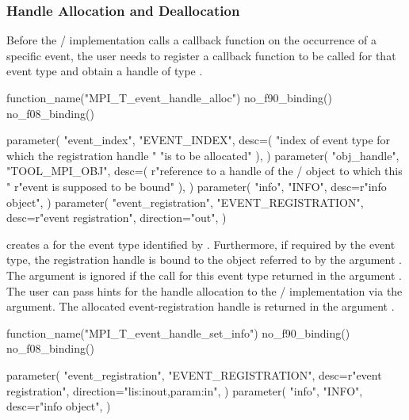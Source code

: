 \subsubsection{Handle Allocation and Deallocation}
\label{sec:tools:mpit:eventalloc}

Before the \MPI/ implementation calls a callback function on the occurrence of
a specific event, the user needs to register a callback function to be called for
that event type and obtain a handle of type
.

\begin{mpi-binding}
    function_name("MPI_T_event_handle_alloc")
    no_f90_binding()
    no_f08_binding()

    parameter(
        "event_index",
        "EVENT_INDEX",
        desc=(
            "index of event type for which the registration handle "
            "is to be allocated"
        ),
    )
    parameter(
        "obj_handle",
        "TOOL_MPI_OBJ",
        desc=(
            r"reference to a handle of the \mpi/ object to which this "
            r"event is supposed to be bound"
        ),
    )
    parameter(
        "info",
        "INFO",
        desc=r"info object",
    )
    parameter(
        "event_registration",
        "EVENT_REGISTRATION",
        desc=r"event registration",
        direction="out",
    )
\end{mpi-binding}

 creates a 
for the event type identified by . Furthermore,
if required by the event type, the registration handle is bound to the
object referred to by the argument .  The argument
 is ignored if the 
call for this event type returned  in the
argument .  The user can pass hints for the handle
allocation to the \MPI/ implementation via the  argument.  The
allocated event-registration handle is returned in the argument
.

\begin{mpi-binding}
    function_name("MPI_T_event_handle_set_info")
    no_f90_binding()
    no_f08_binding()

    parameter(
        "event_registration",
        "EVENT_REGISTRATION",
        desc=r"event registration",
        direction="lis:inout,param:in",
    )
    parameter(
        "info",
        "INFO",
        desc=r"info object",
    )
\end{mpi-binding}

